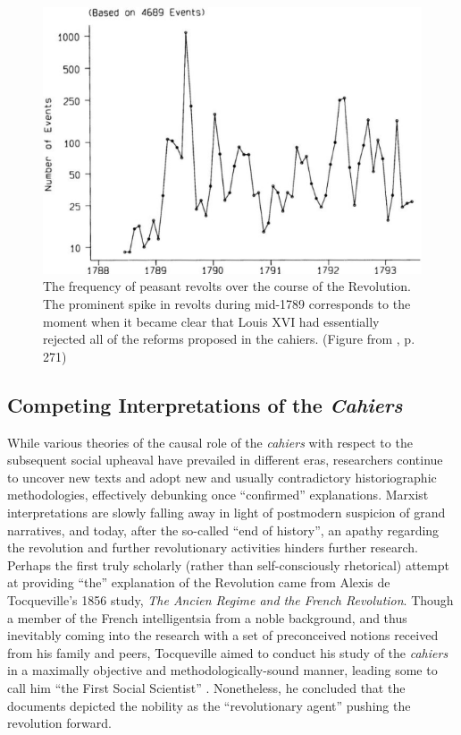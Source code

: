 \begin{figure}
    \centering
    \includegraphics{ch1_figs/markoff_96_fig6-1.png}
    \caption{The frequency of peasant revolts over the course of the Revolution. The prominent spike in revolts during mid-1789 corresponds to the moment when it became clear that Louis XVI had essentially rejected all of the reforms proposed in the cahiers. (Figure from \cite{markoff_abolition_1996}, p. 271)}
    \label{fig:revolts}
\end{figure}

\subsection{Competing Interpretations of the \textit{Cahiers}}

While various theories of the causal role of the \textit{cahiers} with respect to the subsequent social upheaval have prevailed in different eras, researchers continue to uncover new texts and adopt new and usually contradictory historiographic methodologies, effectively debunking once ``confirmed'' explanations. Marxist interpretations are slowly falling away in light of postmodern suspicion of grand narratives, and today, after the so-called ``end of history'', an apathy regarding the revolution and further revolutionary activities hinders further research. Perhaps the first truly scholarly (rather than self-consciously rhetorical) attempt at providing ``the'' explanation of the Revolution came from Alexis de Tocqueville's 1856 study, \textit{The Ancien Regime and the French Revolution}. Though a member of the French intelligentsia from a noble background, and thus inevitably coming into the research with a set of preconceived notions received from his family and peers, Tocqueville aimed to conduct his study of the \textit{cahiers} in a maximally objective and methodologically-sound manner, leading some to call him ``the First Social Scientist'' \citep{elster_alexis_2009}. Nonetheless, he concluded that the documents depicted the nobility as the ``revolutionary agent'' pushing the revolution forward.

